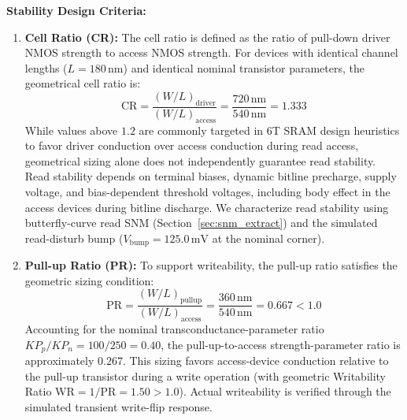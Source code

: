 \documentclass[conference]{IEEEtran}
\begin{document}
\textbf{Stability Design Criteria:}
\begin{enumerate}
    \item \textbf{Cell Ratio (CR):} The cell ratio is defined as the ratio of pull-down driver NMOS strength to access NMOS strength. For devices with identical channel lengths ($L = 180\,\text{nm}$) and identical nominal transistor parameters, the geometrical cell ratio is:
    \begin{equation}
    \text{CR} = \frac{(W/L)_{\text{driver}}}{(W/L)_{\text{access}}} = \frac{720\,\text{nm}}{540\,\text{nm}} = 1.333
    \end{equation}
    While values above $1.2$ are commonly targeted in 6T SRAM design heuristics to favor driver conduction over access conduction during read access, geometrical sizing alone does not independently guarantee read stability. Read stability depends on terminal biases, dynamic bitline precharge, supply voltage, and bias-dependent threshold voltages, including body effect in the access devices during bitline discharge. We characterize read stability using butterfly-curve read SNM (Section~\ref{sec:snm_extract}) and the simulated read-disturb bump ($V_{\text{bump}}=125.0\,\text{mV}$ at the nominal corner).
    \item \textbf{Pull-up Ratio (PR):} To support writeability, the pull-up ratio satisfies the geometric sizing condition:
    \begin{equation}
    \text{PR} = \frac{(W/L)_{\text{pullup}}}{(W/L)_{\text{access}}} = \frac{360\,\text{nm}}{540\,\text{nm}} = 0.667 < 1.0
    \end{equation}
    Accounting for the nominal transconductance-parameter ratio $KP_p/KP_n = 100/250 = 0.40$, the pull-up-to-access strength-parameter ratio is approximately $0.267$. This sizing favors access-device conduction relative to the pull-up transistor during a write operation (with geometric Writability Ratio $\text{WR} = 1/\text{PR} = 1.50 > 1.0$). Actual writeability is verified through the simulated transient write-flip response.
\end{enumerate}
\end{document}
